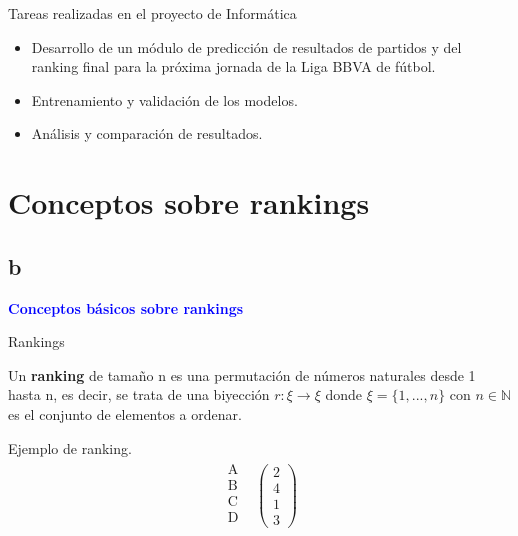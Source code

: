 \documentclass{beamer}
\begin{document}
	\begin{frame}{Tareas realizadas en el proyecto de Informática}
		\begin{itemize}
			\item Desarrollo de un módulo de predicción de resultados de partidos y del ranking final para la próxima jornada de la Liga BBVA de fútbol.
			\item Entrenamiento y validación de los modelos.
			\item Análisis y comparación de resultados. 
		\end{itemize}
	\end{frame}

	\section{Conceptos sobre rankings}
	\subsection{b}
	\begin{frame}
		\begin{center}
			\Huge\textbf{\textsf{\textcolor{blue}{Conceptos básicos sobre rankings}}}
		\end{center}
	\end{frame}	
	
	\begin{frame}{Rankings}
		\begin{defi} 
			Un \textbf{ranking} de tamaño n es una permutación de números naturales desde 1 hasta n, es decir, se trata de una biyección $r: \xi \rightarrow \xi$ donde $\xi = \{1,...,n\}$ con $n \in \mathbb{N}$ es el conjunto de elementos a ordenar.
		\end{defi}
		
		\begin{ejem}
			Ejemplo de ranking.\\
			$$\begin{array}{ccc}
			\begin{array}{c}
			\text{A}\\
			\text{B} \\
			\text{C} \\
			\text{D} \\
			\end{array} & \left(\begin{array}{c}
			2\\
			4\\
			1\\
			3
			\end{array} \right)
			\end{array}  $$	
		\end{ejem}	
	\end{frame}
\end{document}
